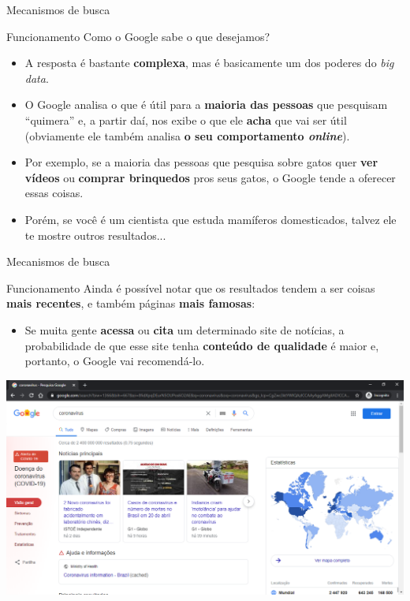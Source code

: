 \begin{frame}{Mecanismos de busca}
	\begin{block}{Funcionamento}
		Como o Google sabe o que desejamos?
		\begin{itemize}
			\item A resposta é bastante \textbf{complexa}, mas é basicamente um dos poderes do \textit{big data}.
			\item O Google analisa o que é útil para a \textbf{maioria das pessoas} que pesquisam ``quimera'' e, a partir daí, nos exibe o que ele \textbf{acha} que vai ser útil (obviamente ele também analisa \textbf{o seu comportamento \textit{online}}).
			\item Por exemplo, se a maioria das pessoas que pesquisa sobre gatos quer \textbf{ver vídeos} ou \textbf{comprar brinquedos} pros seus gatos, o Google tende a oferecer essas coisas.
			\item Porém, se você é um cientista que estuda mamíferos domesticados, talvez ele te mostre outros resultados...
		\end{itemize}
	\end{block}

\end{frame}


\begin{frame}{Mecanismos de busca}
	\begin{block}{Funcionamento}
		Ainda é possível notar que os resultados tendem a ser coisas \textbf{mais recentes}, e também páginas \textbf{mais famosas}:
		\begin{itemize}
			\item Se muita gente \textbf{acessa }ou \textbf{cita} um determinado site de notícias, a probabilidade de que esse site tenha \textbf{conteúdo de qualidade }é maior e, portanto, o Google vai recomendá-lo.
		\end{itemize}
	\end{block}

	\centering
	\includegraphics[width=0.7\linewidth]{Figuras/Ch03/fig5}
\end{frame}


